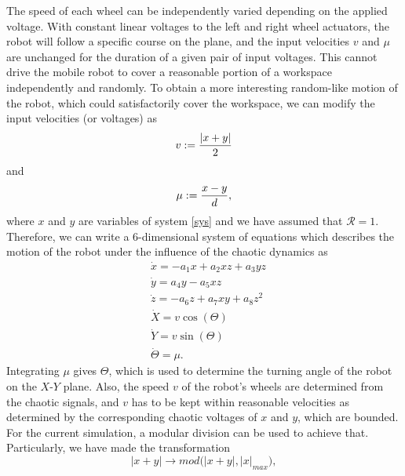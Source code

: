 \documentclass[final,5p,times,twocolumn]{elsarticle}
\begin{document}
The speed of each wheel can be independently varied depending on the applied voltage. With constant linear voltages to the left and right wheel actuators, the robot will follow a specific course on the plane, and the input velocities $v$ and $\mu$ are unchanged for the duration of a given pair of input voltages. This cannot drive the mobile robot to cover a reasonable portion of a workspace independently and randomly. To obtain a more interesting random-like motion of the robot, which could satisfactorily cover the workspace, we can modify the input velocities (or voltages) as
\begin{equation}
v := {|x+y|\over2}\label{velocity}
\end{equation}
and 
\begin{equation}
\mu := {x-y\over d}\label{angularVel},
\end{equation}
where $x$ and $y$ are variables of system \eqref{sys} and we have assumed that $\mathcal{R}=1$. Therefore, we can write a $6$-dimensional system of equations which describes the motion of the robot under the influence of the chaotic dynamics as
\begin{equation}
\begin{split}
&\dot{x} = -a_1x+a_2xz+a_3yz\\
&\dot{y} = a_4y-a_5xz\\
&\dot{z} = -a_6z+a_7xy+a_8z^2\\\label{sysrobot}
&\dot{X} = v\cos(\Theta)\\
&\dot{Y} = v\sin(\Theta)\\
&\dot{\Theta} = \mu.
\end{split}
\end{equation}
Integrating $\mu$ gives $\Theta$, which is used to determine the turning angle of the robot on the $X$-$Y$ plane. Also, the speed $v$ of the robot's wheels are determined from the chaotic signals, and $v$ has to be kept within reasonable velocities as determined by the corresponding chaotic voltages of $x$ and $y$, which are bounded. For the current simulation, a modular division can be used to achieve that. Particularly, we have made the transformation
\begin{equation}
|x+y|\rightarrow{mod \bigg(|x+y|, |x|_{max}\bigg)},
\end{equation}
\end{document}
